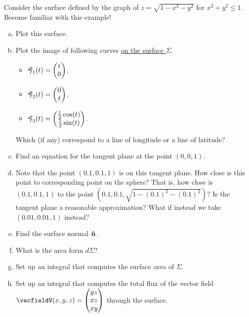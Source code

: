 \documentclass[12pt]{article} %
\begin{document}
\begin{problem}
    Consider the surface defined by the graph of $z = \sqrt{1-x^2-y^2}$ for $x^2+y^2\leq 1$. Become familiar with this example!
    \begin{enumerate}[(a)]
        \item Plot this surface.
        \item Plot the image of following curves \underline{on the surface $\Sigma$}. 
        \begin{itemize}
            \item $\boldsymbol{\vec{\gamma}}_1(t) = \begin{pmatrix} t\\ 0 \end{pmatrix}$.
            \item $\boldsymbol{\vec{\gamma}}_2(t) = \begin{pmatrix} 0 \\ t \end{pmatrix}$. 
            \item $\boldsymbol{\vec{\gamma}}_3(t) = \begin{pmatrix} \frac{1}{2} \cos(t) \\ \frac{1}{2} \sin(t) \end{pmatrix}$.
        \end{itemize}
        Which (if any) correspond to a line of longitude or a line of latitude?
        \item Find an equation for the tangent plane at the point $(0,0,1)$.
        \item Note that the point $(0.1,0.1,1)$ is on this tangent plane.  How close is this point to corresponding point on the sphere? That is, how close is $(0.1,0.1,1)$ to the point $(0.1,0.1,\sqrt{1-(0.1)^2-(0.1)^2})$? Is the tangent plane a reasonable approximation? What if instead we take $(0.01,0.01,1)$ instead?
        \item Find the surface normal $\boldsymbol{\hat{n}}$.
        \item What is the area form $d\Sigma$?
        \item Set up an integral that computes the surface area of $\Sigma$.
        \item Set up an integral that computes the total flux of the vector field $\vecfieldV(x,y,z) = \begin{pmatrix} yz \\ xz \\ xy \end{pmatrix}$ through the surface.
    \end{enumerate}
\end{problem}
\end{document}
